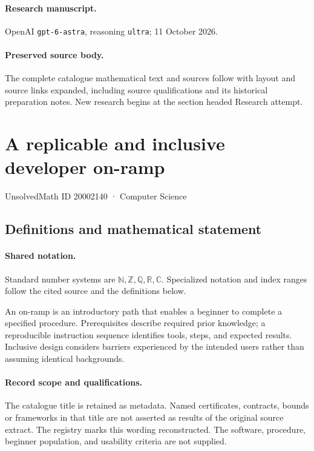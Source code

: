 \documentclass[11pt]{article}
\begin{document}
\paragraph{Research manuscript.} OpenAI \texttt{gpt-6-astra}, reasoning \texttt{ultra}; 11 October 2026.
\paragraph{Preserved source body.} The complete catalogue mathematical text and sources follow with layout and source links expanded, including source qualifications and its historical preparation notes. New research begins at the section headed Research attempt.

\section{A replicable and inclusive developer on-ramp}\label{20002140}
{\small UnsolvedMath ID 20002140 · Computer Science}
\subsection{Definitions and mathematical statement}

\paragraph{Shared notation.}Standard number systems are $\mathbb N,\mathbb Z,\mathbb Q,\mathbb R,\mathbb C$. Specialized notation and index ranges follow the cited source and the definitions below.


An on-ramp is an introductory path that enables a beginner to complete a specified procedure. Prerequisites describe required prior knowledge; a reproducible instruction sequence identifies tools, steps, and expected results. Inclusive design considers barriers experienced by the intended users rather than assuming identical backgrounds.
\paragraph{Record scope and qualifications.}
The catalogue title is retained as metadata. Named certificates, contracts, bounds or frameworks in that title are not asserted as results of the original source extract.
The registry marks this wording reconstructed. The software, procedure, beginner population, and usability criteria are not supplied.
\end{document}

